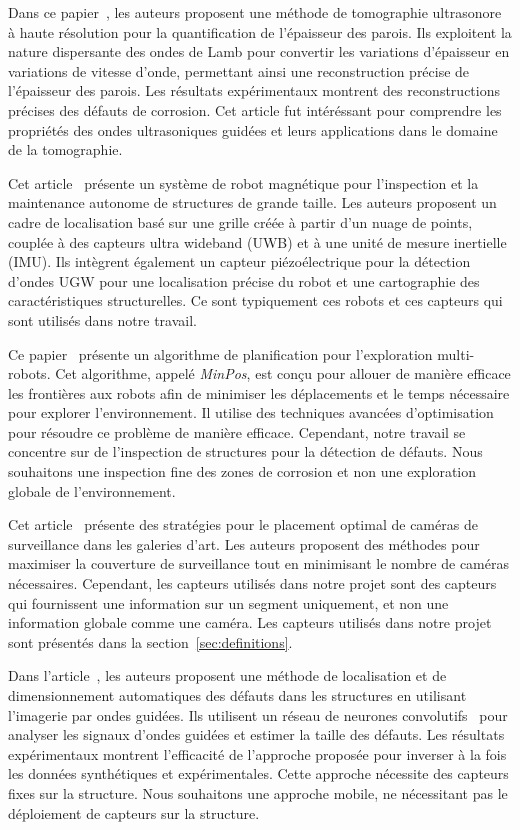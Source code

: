 \documentclass[francais,RandD]{rapportPFE}
\begin{document}
		Dans ce papier~\cite{HUTHWAITE2013979}, les auteurs proposent une méthode de tomographie ultrasonore à haute résolution pour la quantification de l'épaisseur des parois.
		Ils exploitent la nature dispersante des ondes de Lamb pour convertir les variations d'épaisseur en variations de vitesse d'onde, permettant ainsi une reconstruction précise de l'épaisseur des parois.
		Les résultats expérimentaux montrent des reconstructions précises des défauts de corrosion.
		Cet article fut intéréssant pour comprendre les propriétés des ondes ultrasoniques guidées et leurs applications dans le domaine de la tomographie.

		Cet article~\cite{s22093235} présente un système de robot magnétique pour l'inspection et la maintenance autonome de structures de grande taille.
		Les auteurs proposent un cadre de localisation basé sur une grille créée à partir d'un nuage de points, couplée à des capteurs ultra wideband (UWB) et à une unité de mesure inertielle (IMU).
		Ils intègrent également un capteur piézoélectrique pour la détection d'ondes UGW pour une localisation précise du robot et une cartographie des caractéristiques structurelles.
		Ce sont typiquement ces robots et ces capteurs qui sont utilisés dans notre travail.

		Ce papier~\cite{bautin:hal-00757960} présente un algorithme de planification pour l'exploration multi-robots.
		Cet algorithme, appelé \textit{MinPos}, est conçu pour allouer de manière efficace les frontières aux robots afin de minimiser les déplacements et le temps nécessaire pour explorer l'environnement. Il utilise des techniques avancées d'optimisation pour résoudre ce problème de manière efficace.
		Cependant, notre travail se concentre sur de l'inspection de structures pour la détection de défauts.
		Nous souhaitons une inspection fine des zones de corrosion et non une exploration globale de l'environnement.

		Cet article~\cite{article455556} présente des stratégies pour le placement optimal de caméras de surveillance dans les galeries d'art.
		Les auteurs proposent des méthodes pour maximiser la couverture de surveillance tout en minimisant le nombre de caméras nécessaires.
		Cependant, les capteurs utilisés dans notre projet sont des capteurs qui fournissent une information sur un segment uniquement, et non une information globale comme une caméra.
		Les capteurs utilisés dans notre projet sont présentés dans la section~\ref{sec:definitions}.

		Dans l'article~\cite{articlesvsdf}, les auteurs proposent une méthode de localisation et de dimensionnement automatiques des défauts dans les structures en utilisant l'imagerie par ondes guidées.
		Ils utilisent un réseau de neurones convolutifs~\cite{enwiki:1159408824} pour analyser les signaux d'ondes guidées et estimer la taille des défauts.
		Les résultats expérimentaux montrent l'efficacité de l'approche proposée pour inverser à la fois les données synthétiques et expérimentales.
		Cette approche nécessite des capteurs fixes sur la structure.
		Nous souhaitons une approche mobile, ne nécessitant pas le déploiement de capteurs sur la structure.
\end{document}
